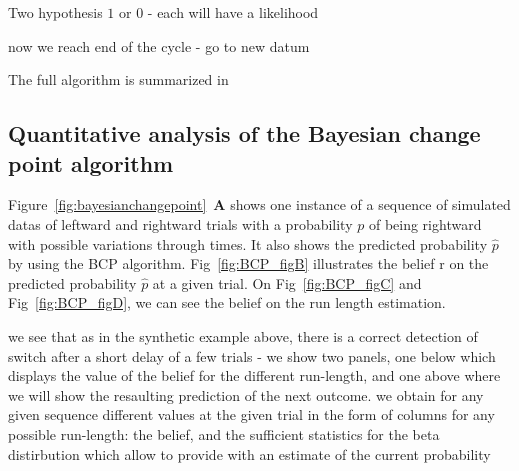 \documentclass[profile,final,english,draft]{article}%
\newcommand{\seeFig}[1]{Figure~\ref{fig:#1}}
\begin{document}
Two hypothesis $1$ or $0$ - each will have a likelihood




now we reach end of the cycle - go to new datum

The full algorithm is summarized in%
\subsection{Quantitative analysis of the Bayesian change point algorithm}



%
%
%
%

\seeFig{bayesianchangepoint}~\textbf{A} shows one instance of a sequence of simulated datas of leftward and rightward trials with a probability $p$ of being rightward with possible variations through times. It also shows the predicted probability $\hat{p}$ by using the BCP algorithm. Fig~\ref{fig:BCP_figB} illustrates the belief r on the predicted probability $\hat{p}$ at a given trial. On Fig~\ref{fig:BCP_figC} and Fig~\ref{fig:BCP_figD}, we can see the belief on the run length estimation.

we see that as in the synthetic example above,
there is a correct detection of switch after a short delay of a few trials
- we show two panels, one below which displays the value of the belief for the different run-length, and one above where we will show the resaulting prediction of the next outcome.
we obtain for any given sequence different values at the given trial in the form of columns for any possible run-length: the belief,
and the sufficient statistics for the beta distirbution which allow to provide with an estimate of the current probability
\end{document}

